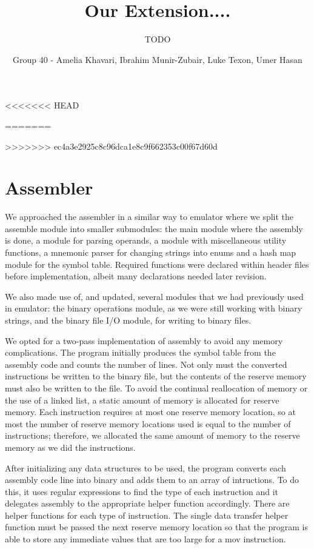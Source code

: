 \documentclass[11pt]{article}
\begin{document}
\title{Our Extension....}
<<<<<<< HEAD
\author{TODO}
=======
\author{Group 40 - Amelia Khavari, Ibrahim Munir-Zubair, Luke Texon, Umer Hasan}
>>>>>>> ec4a3e2925c8c96dca1e8c9f662353c00f67d60d

\maketitle

\section{Assembler}
We approached the assembler in a similar way to emulator where we split the 
assemble module into smaller submodules: the main module where the assembly is done, 
a module for parsing operands, a module with miscellaneous utility functions, 
a mnemonic parser for changing strings into enums and 
a hash map module for the symbol table. Required functions were declared  within header files 
before implementation, albeit many declarations needed later revision.

We also made use of, and updated, several modules that we had previously used in emulator: 
the binary operations module, as we were still working with binary strings, 
and the binary file I/O module, for writing to binary files.     

We opted for a two-pass implementation of assembly to avoid any memory complications.
The program initially produces the symbol table from the assembly code and counts the number of lines.
Not only must the converted instructions be written to the binary file, but the contents of the reserve memory
must also be written to the file. To avoid the continual reallocation of memory or the use of a linked list, 
a static amount of memory is allocated for reserve memory. 
Each instruction requires at most one reserve memory location, so at most the number of 
reserve memory locations used is equal to the number of instructions; therefore, we allocated the 
same amount of memory to the reserve memory as we did the instructions.

After initializing any data structures to be used, the program converts each assembly 
code line into binary and adds them to an array of intructions. 
To do this, it uses regular expressions to find the type of each instruction and
it delegates assembly to the appropriate helper function accordingly.
There are helper functions for each type of instruction. The single data transfer helper function 
must be passed the next reserve memory location 
so that the program is able to store any immediate values that are too large for a mov instruction.
\end{document}
